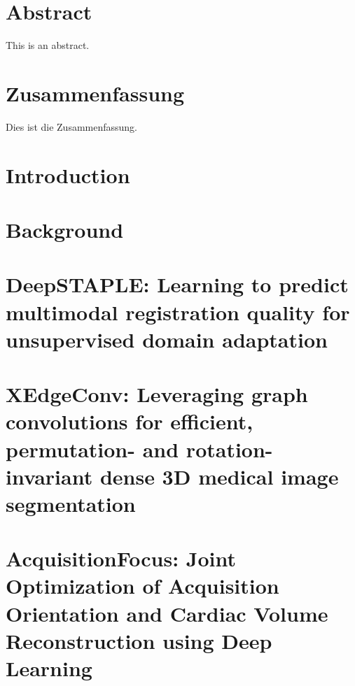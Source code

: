 \documentclass[
	11pt,
	a4paper,
	twoside,
	headsepline,
	titlepage,
	DIV=11,
	BCOR=12mm,
	captions=tableheading,
	chapterprefix=on,
	numbers=noenddot,
]{scrbook}
\begin{document}
    \thispagestyle{headings}
    

    \enlargethispage{1\baselineskip}
    \setcounter{page}{1}

    \chapter*{Abstract} %
        This is an abstract.
    \cleardoublepage

    \chapter*{Zusammenfassung} %
        Dies ist die Zusammenfassung.
    \cleardoublepage

    \tableofcontents
    \cleardoublepage

    \chapter{Introduction} %
        

    \chapter{Background} %
        

    \chapter[DeepSTAPLE]{DeepSTAPLE: Learning to predict multimodal registration quality for unsupervised domain adaptation}
        

    \chapter[XEdgeConv]{XEdgeConv: Leveraging graph convolutions for efficient, permutation- and rotation-invariant dense 3D medical image segmentation}
        

    \chapter[AcquisitionFocus]{AcquisitionFocus: Joint Optimization of Acquisition Orientation and Cardiac Volume Reconstruction using Deep Learning}
        
\end{document}
